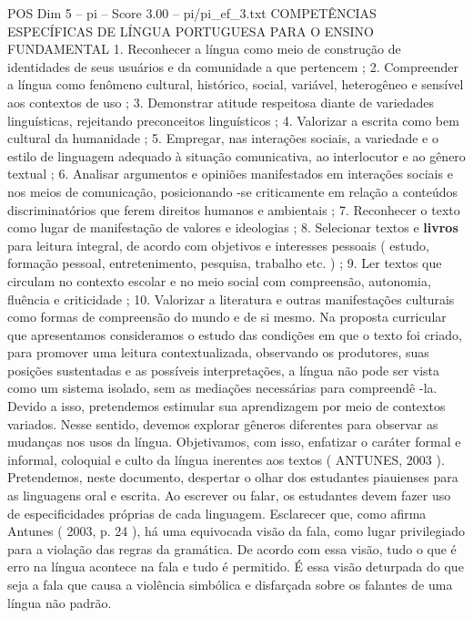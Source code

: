 \begin{textsample}{POS Dim 5 – pi – Score 3.00 – pi/pi\_ef\_3.txt}  \label{ex:f5_pos_240}
COMPETÊNCIAS ESPECÍFICAS DE LÍNGUA PORTUGUESA PARA O ENSINO FUNDAMENTAL 1.
Reconhecer a língua como meio de construção de identidades de seus usuários e da comunidade a que pertencem ; 2.
Compreender a língua como fenômeno cultural, histórico, social, variável, heterogêneo e sensível aos contextos de uso ; 3.
Demonstrar atitude respeitosa diante de variedades linguísticas, rejeitando preconceitos linguísticos ; 4.
Valorizar a escrita como bem cultural da humanidade ; 5.
Empregar, nas interações sociais, a variedade e o estilo de linguagem adequado à situação comunicativa, ao interlocutor e ao gênero textual ; 6.
Analisar argumentos e opiniões manifestados em interações sociais e nos meios de comunicação, posicionando -se criticamente em relação a conteúdos discriminatórios que ferem direitos humanos e ambientais ; 7.
Reconhecer o texto como lugar de manifestação de valores e ideologias ; 8.
Selecionar textos e \textbf{livros} para leitura integral, de acordo com objetivos e interesses pessoais ( estudo, formação pessoal, entretenimento, pesquisa, trabalho etc. ) ; 9.
Ler textos que circulam no contexto escolar e no meio social com compreensão, autonomia, fluência e criticidade ; 10.
Valorizar a literatura e outras manifestações culturais como formas de compreensão do mundo e de si mesmo.
Na proposta curricular que apresentamos consideramos o estudo das condições em que o texto foi criado, para promover uma leitura contextualizada, observando os produtores, suas posições sustentadas e as possíveis interpretações, a língua não pode ser vista como um sistema isolado, sem as mediações necessárias para compreendê -la.
Devido a isso, pretendemos estimular sua aprendizagem por meio de contextos variados.
Nesse sentido, devemos explorar gêneros diferentes para observar as mudanças nos usos da língua.
Objetivamos, com isso, enfatizar o caráter formal e informal, coloquial e culto da língua inerentes aos textos ( ANTUNES, 2003 ).
Pretendemos, neste documento, despertar o olhar dos estudantes piauienses para as linguagens oral e escrita.
Ao escrever ou falar, os estudantes devem fazer uso de especificidades próprias de cada linguagem.
Esclarecer que, como afirma Antunes ( 2003, p. 24 ), há uma equivocada visão da fala, como lugar privilegiado para a violação das regras da gramática.
De acordo com essa visão, tudo o que é erro na língua acontece na fala e tudo é permitido.
É essa visão deturpada do que seja a fala que causa a violência simbólica e disfarçada sobre os falantes de uma língua não padrão.

\end{textsample}
